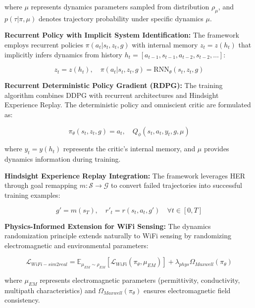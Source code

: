 \documentclass[journal]{IEEEtran}
\begin{document}
where $\mu$ represents dynamics parameters sampled from distribution $\rho_\mu$, and $p(\tau|\pi,\mu)$ denotes trajectory probability under specific dynamics $\mu$.

\textbf{Recurrent Policy with Implicit System Identification:}
The framework employs recurrent policies $\pi(a_t|s_t, z_t, g)$ with internal memory $z_t = z(h_t)$ that implicitly infers dynamics from history $h_t = [a_{t-1}, s_{t-1}, a_{t-2}, s_{t-2}, \ldots]$:

\begin{equation}
z_t = z(h_t), \quad \pi(a_t|s_t, z_t, g) = \text{RNN}_\theta(s_t, z_t, g)
\label{eq:peng_recurrent_policy}
\end{equation}

\textbf{Recurrent Deterministic Policy Gradient (RDPG):}
The training algorithm combines DDPG with recurrent architectures and Hindsight Experience Replay. The deterministic policy and omniscient critic are formulated as:

\begin{equation}
\pi_\theta(s_t, z_t, g) = a_t, \quad Q_\phi(s_t, a_t, y_t, g, \mu)
\label{eq:peng_rdpg_formulation}
\end{equation}

where $y_t = y(h_t)$ represents the critic's internal memory, and $\mu$ provides dynamics information during training.

\textbf{Hindsight Experience Replay Integration:}
The framework leverages HER through goal remapping $m: \mathcal{S} \rightarrow \mathcal{G}$ to convert failed trajectories into successful training examples:

\begin{equation}
g' = m(s_T), \quad r'_t = r(s_t, a_t, g') \quad \forall t \in [0, T]
\label{eq:peng_her_remapping}
\end{equation}

\textbf{Physics-Informed Extension for WiFi Sensing:}
The dynamics randomization principle extends naturally to WiFi sensing by randomizing electromagnetic and environmental parameters:

\begin{equation}
\mathcal{L}_{WiFi-sim2real} = \mathbb{E}_{\mu_{EM} \sim \rho_{EM}} \left[ \mathcal{L}_{WiFi}(\pi_\theta, \mu_{EM}) \right] + \lambda_{phys} \Omega_{Maxwell}(\pi_\theta)
\label{eq:peng_wifi_extension}
\end{equation}

where $\mu_{EM}$ represents electromagnetic parameters (permittivity, conductivity, multipath characteristics) and $\Omega_{Maxwell}(\pi_\theta)$ ensures electromagnetic field consistency.
\end{document}
